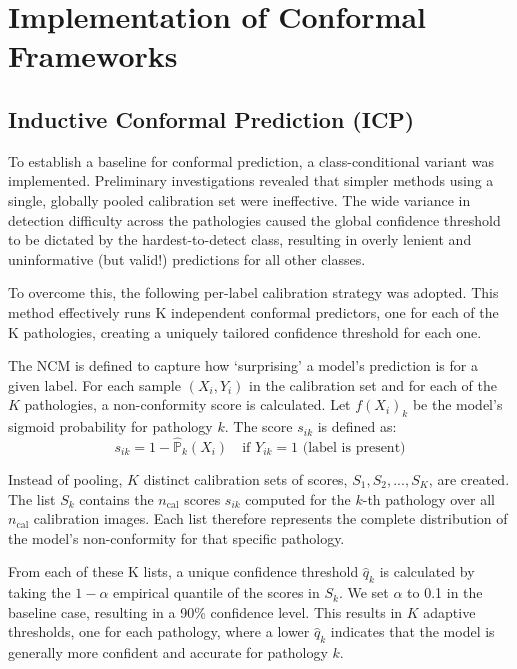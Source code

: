 \section{Implementation of Conformal Frameworks}

\subsection{Inductive Conformal Prediction (ICP)}

To establish a baseline for conformal prediction,
a class-conditional variant was implemented.
Preliminary investigations revealed that simpler methods using a single,
globally pooled calibration set were ineffective.
The wide variance in detection difficulty across the pathologies
caused the global confidence threshold to be dictated by the hardest-to-detect class,
resulting in overly lenient and uninformative (but valid!) predictions for all other classes.

To overcome this, the following per-label calibration strategy was adopted.
This method effectively runs K independent conformal predictors,
one for each of the K pathologies, creating a uniquely tailored confidence threshold for each one.

The NCM is defined to capture how `surprising' a model's prediction is for a given label.
For each sample \((X_i, Y_i)\) in the calibration set and for each of the \(K\) pathologies,
a non-conformity score is calculated.
Let \(f(X_i)_k\) be the model's sigmoid probability for pathology \(k\). The score \(s_{ik}\) is defined as:
\[
    s_{ik} = 1 - \hat{\mathbb{P}}_k(X_i) \quad \text{if } Y_{ik} = 1 \text{ (label is present)}
\]

Instead of pooling, \(K\) distinct calibration sets of scores, \(S_1, S_2, ..., S_K\), are created.
The list \(S_k\) contains the \(n_{\text{cal}}\) scores \(s_{ik}\) computed
for the \(k\)-th pathology over all \(n_{\text{cal}}\) calibration images.
Each list therefore represents the complete distribution
of the model's non-conformity for that specific pathology.

From each of these K lists, a unique confidence threshold \(\hat{q}_k\) is calculated
by taking the \(1-\alpha\) empirical quantile of the scores in \(S_k\).
We set \(\alpha\) to 0.1 in the baseline case, resulting in a 90\% confidence level.
This results in \(K\) adaptive thresholds, one for each pathology,
where a lower \(\hat{q}_k\) indicates that
the model is generally more confident and accurate for pathology \(k\).

